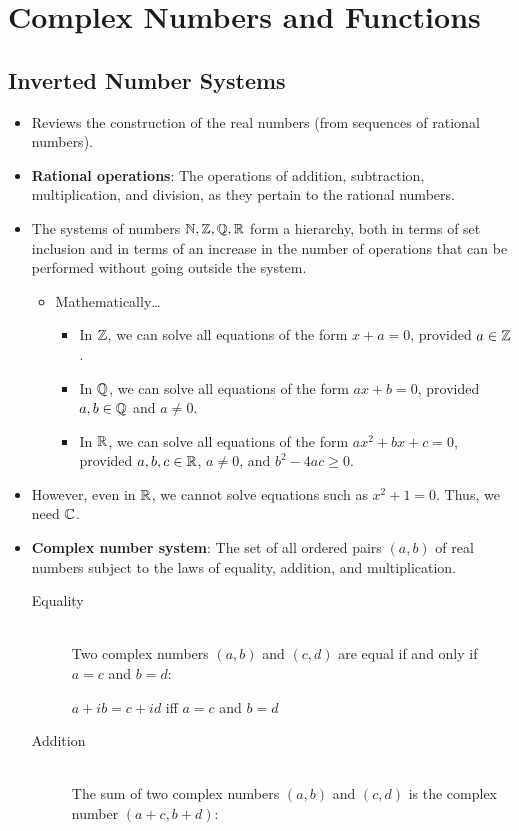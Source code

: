 \documentclass[../main.tex]{subfiles}
\begin{document}
\chapter{Complex Numbers and Functions}\label{cht:19}
\section{Inverted Number Systems}
\begin{itemize}
    \item {}Reviews the construction of the real numbers (from sequences of rational numbers).
    \item \textbf{Rational operations}: The operations of addition, subtraction, multiplication, and division, as they pertain to the rational numbers.
    \item The systems of numbers $\mathbb{N},\mathbb{Z},\mathbb{Q},\mathbb{R}$ form a hierarchy, both in terms of set inclusion and in terms of an increase in the number of operations that can be performed without going outside the system.
    \begin{itemize}
        \item Mathematically\dots
        \begin{itemize}
            \item In $\mathbb{Z}$, we can solve all equations of the form $x+a=0$, provided $a\in\mathbb{Z}$.
            \item In $\mathbb{Q}$, we can solve all equations of the form $ax+b=0$, provided $a,b\in\mathbb{Q}$ and $a\neq 0$.
            \item In $\mathbb{R}$, we can solve all equations of the form $ax^2+bx+c=0$, provided $a,b,c\in\mathbb{R}$, $a\neq 0$, and $b^2-4ac\geq 0$.
        \end{itemize}
    \end{itemize}
    \item However, even in $\mathbb{R}$, we cannot solve equations such as $x^2+1=0$. Thus, we need $\mathbb{C}$.
    \item \textbf{Complex number system}: The set of all ordered pairs $(a,b)$ of real numbers subject to the laws of equality, addition, and multiplication.
    \begin{description}
        \item[Equality]\hfill\\Two complex numbers $(a,b)$ and $(c,d)$ are equal if and only if $a=c$ and $b=d$:
        \begin{center}
            $a+ib=c+id$ iff $a=c$ and $b=d$
        \end{center}
        \item[Addition]\hfill\\The sum of two complex numbers $(a,b)$ and $(c,d)$ is the complex number $(a+c,b+d)$:

\end{description}
\end{itemize}
\end{document}
